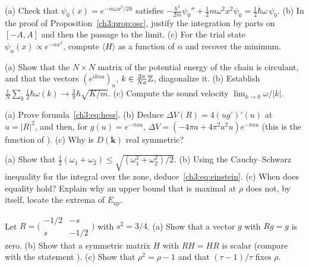 \begin{exercise}[Oscillator]\label{ch3:ex:osc}
(a) Check that $\psi_0(x)=e^{-m\omega x^2/2\hbar}$ satisfies $-\tfrac{\hbar^2}{2m}\psi_0''+\tfrac12m\omega^2x^2\psi_0=\tfrac12\hbar\omega\,\psi_0$.
(b) In the proof of Proposition~\ref{ch3:prop:osc}, justify the integration by parts on $[-A,A]$ and then the
passage to the limit. (c) For the trial state $\psi_\alpha(x)\propto e^{-\alpha x^2}$, compute $\langle H\rangle$ as a
function of $\alpha$ and recover the minimum.
\end{exercise}

\begin{exercise}\label{ch3:ex:chaine}
(a) Show that the $N\times N$ matrix of the potential energy of the chain is circulant, and that the vectors
$(e^{ikna})_n$, $k\in\tfrac{2\pi}{Na}\mathbb{Z}$, diagonalize it. (b) Establish
$\frac1N\sum_k\tfrac12\hbar\omega(k)\to\tfrac2\pi\hbar\sqrt{K/m}$. (c) Compute the sound velocity $\lim_{k\to0}\omega/|k|$.
\end{exercise}

\begin{exercise}\label{ch3:ex:hess}
(a) Prove formula~\eqref{ch3:eq:hess}. (b) Deduce $\Delta V(R)=4(ug')'(u)$ at $u=|R|^2$, and then, for
$g(u)=e^{-\pi au}$, $\Delta V=(-4\pi a+4\pi^2a^2u)e^{-\pi au}$ (this is the function  of
). (c) Why is $D(\mathbf k)$ real symmetric?
\end{exercise}

\begin{exercise}\label{ch3:ex:einstein}
(a) Show that $\tfrac12(\omega_1+\omega_2)\le\sqrt{(\omega_1^2+\omega_2^2)/2}$. (b) Using the
Cauchy--Schwarz inequality for the integral over the zone, deduce~\eqref{ch3:eq:einstein}. (c) When does equality hold?
Explain why an upper bound that is maximal at $\rho$ does not, by itself, locate the extrema of $E_{\mathrm{zp}}$.
\end{exercise}

\begin{exercise}\label{ch3:ex:rot}
Let $R=\bigl(\begin{smallmatrix}-1/2&-s\\s&-1/2\end{smallmatrix}\bigr)$ with $s^2=3/4$. (a) Show that a vector
$g$ with $Rg=g$ is zero. (b) Show that a symmetric matrix $H$ with $RH=HR$ is scalar (compare with the
statement ). (c) Show that $\rho^2=\rho-1$ and that $(\tau-1)/\tau$ fixes $\rho$.
\end{exercise}

